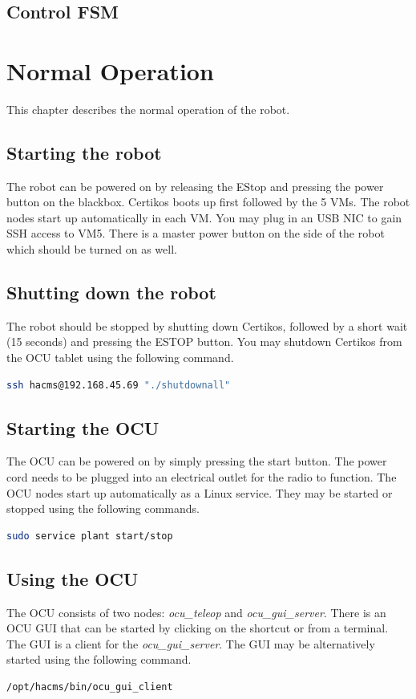 \section{Control FSM}
\label{sec:fsm}



\chapter{Normal Operation}
This chapter describes the normal operation of the robot. 

\section{Starting the robot}
The robot can be powered on by releasing the EStop and pressing the power button on the
blackbox. Certikos boots up first followed by the 5 VMs. The robot nodes start up automatically
in each VM. You may plug in an USB NIC to gain SSH access to VM5. 
There is a master power button on the side of the robot which should be turned on as well.

\section{Shutting down the robot}
The robot should be stopped by shutting down Certikos, followed by a short wait (15 seconds)
and pressing the ESTOP button. You may shutdown Certikos from the OCU tablet using the following
command.

\begin{lstlisting}[language=bash]
ssh hacms@192.168.45.69 "./shutdownall"
\end{lstlisting}

\section{Starting the OCU}
The OCU can be powered on by simply pressing the start button. The power cord needs to be
plugged into an electrical outlet for the radio to function. The OCU nodes start up
automatically as a Linux service. They may be started or stopped using the following commands. 

\begin{lstlisting}[language=bash]
sudo service plant start/stop
\end{lstlisting}

\section{Using the OCU}
The OCU consists of two nodes: \emph{ocu\_teleop} and \emph{ocu\_gui\_server}. There is an
OCU GUI that can be started by clicking on
the shortcut or from a terminal. The GUI is a client for the \emph{ocu\_gui\_server}. The GUI
may be alternatively started using the following command.
\begin{lstlisting}[language=bash]
/opt/hacms/bin/ocu_gui_client
\end{lstlisting}


